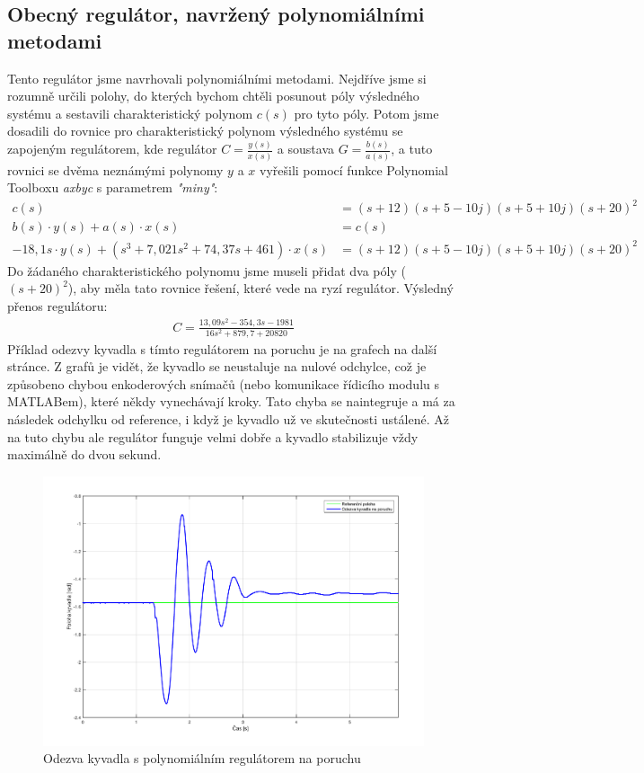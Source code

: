 \documentclass[11pt,a4paper]{article}
\begin{document}
\subsection{Obecný regulátor, navržený polynomiálními metodami}
Tento regulátor jsme navrhovali polynomiálními metodami. Nejdříve jsme si rozumně určili polohy, do kterých bychom chtěli posunout póly výsledného systému a sestavili charakteristický polynom $c(s)$ pro tyto póly. Potom jsme dosadili do rovnice pro charakteristický polynom výsledného systému se zapojeným regulátorem, kde regulátor $C = \frac{y(s)}{x(s)}$ a soustava $G = \frac{b(s)}{a(s)}$, a tuto rovnici se dvěma neznámými polynomy $y$ a $x$ vyřešili pomocí funkce Polynomial Toolboxu \textit{axbyc} s parametrem \textit{"miny"}:
\begin{align*}
c(s) &= (s + 12) (s + 5 - 10j) (s + 5 + 10j) (s + 20)^2	\\
b(s)\cdot y(s) + a(s)\cdot x(s) &= c(s)	\\
-18,1s\cdot y(s) + (s^3 + 7,021s^2 + 74,37s + 461)\cdot x(s) &=  (s + 12) (s + 5 - 10j) (s + 5 + 10j) (s + 20)^2
\end{align*}
Do žádaného charakteristického polynomu jsme museli přidat dva póly ($(s+20)^2$), aby měla tato rovnice řešení, které vede na ryzí regulátor.
\newline
Výsledný přenos regulátoru:
\begin{align*}
C = \frac{13,09s^2 - 354,3s - 1981}{16s^2 + 879,7 + 20820}
\end{align*}
Příklad odezvy kyvadla s tímto regulátorem na poruchu je na grafech na další stránce. Z grafů je vidět, že kyvadlo se neustaluje na nulové odchylce, což je způsobeno chybou enkoderových snímačů (nebo komunikace řídicího modulu s MATLABem), které někdy vynechávají kroky. Tato chyba se naintegruje a má za následek odchylku od reference, i když je kyvadlo už ve skutečnosti ustálené.
\newline
\newline
Až na tuto chybu ale regulátor funguje velmi dobře a kyvadlo stabilizuje vždy maximálně do dvou sekund.
\begin{figure}[H]
	\centering
    \includegraphics[scale=0.55]{odezva_kyvadlo_poly}
    \caption{Odezva kyvadla s polynomiálním regulátorem na poruchu}
\end{figure}
\end{document}
